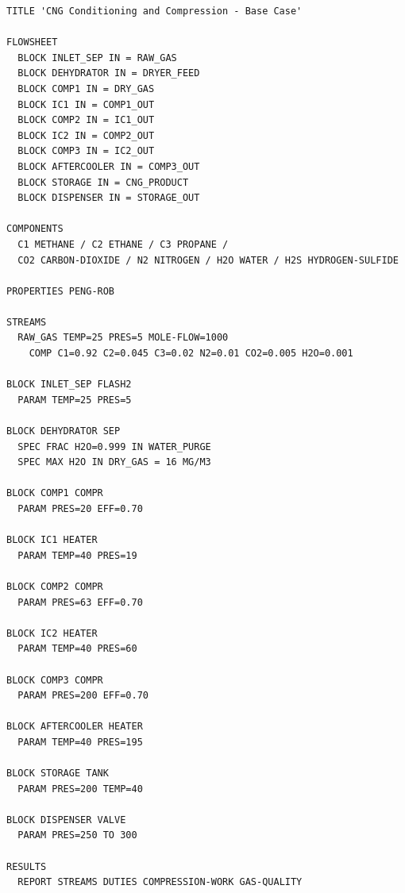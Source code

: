 \documentclass[12pt,twoside,openany]{book}
\begin{document}
\begin{lstlisting}[language={}, caption={CNG\_Compression\_BaseCase.apw (complete)}]
TITLE 'CNG Conditioning and Compression - Base Case'

FLOWSHEET
  BLOCK INLET_SEP IN = RAW_GAS
  BLOCK DEHYDRATOR IN = DRYER_FEED
  BLOCK COMP1 IN = DRY_GAS
  BLOCK IC1 IN = COMP1_OUT
  BLOCK COMP2 IN = IC1_OUT
  BLOCK IC2 IN = COMP2_OUT
  BLOCK COMP3 IN = IC2_OUT
  BLOCK AFTERCOOLER IN = COMP3_OUT
  BLOCK STORAGE IN = CNG_PRODUCT
  BLOCK DISPENSER IN = STORAGE_OUT

COMPONENTS
  C1 METHANE / C2 ETHANE / C3 PROPANE /
  CO2 CARBON-DIOXIDE / N2 NITROGEN / H2O WATER / H2S HYDROGEN-SULFIDE

PROPERTIES PENG-ROB

STREAMS
  RAW_GAS TEMP=25 PRES=5 MOLE-FLOW=1000
    COMP C1=0.92 C2=0.045 C3=0.02 N2=0.01 CO2=0.005 H2O=0.001

BLOCK INLET_SEP FLASH2
  PARAM TEMP=25 PRES=5

BLOCK DEHYDRATOR SEP
  SPEC FRAC H2O=0.999 IN WATER_PURGE
  SPEC MAX H2O IN DRY_GAS = 16 MG/M3

BLOCK COMP1 COMPR
  PARAM PRES=20 EFF=0.70

BLOCK IC1 HEATER
  PARAM TEMP=40 PRES=19

BLOCK COMP2 COMPR
  PARAM PRES=63 EFF=0.70

BLOCK IC2 HEATER
  PARAM TEMP=40 PRES=60

BLOCK COMP3 COMPR
  PARAM PRES=200 EFF=0.70

BLOCK AFTERCOOLER HEATER
  PARAM TEMP=40 PRES=195

BLOCK STORAGE TANK
  PARAM PRES=200 TEMP=40

BLOCK DISPENSER VALVE
  PARAM PRES=250 TO 300

RESULTS
  REPORT STREAMS DUTIES COMPRESSION-WORK GAS-QUALITY
\end{lstlisting}
\end{document}
